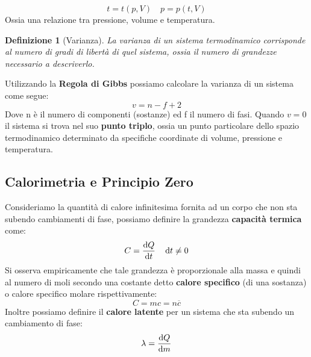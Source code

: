 \documentclass{article}
\newtheorem{defn}{Definizione}[section]
\begin{document}
\[t=t(p,V)\quad p=p(t,V)\]
Ossia una relazione tra pressione, volume e temperatura.
\begin{defn}[Varianza]
La varianza di un sistema termodinamico corrisponde al numero di gradi di libertà di quel sistema, ossia il numero di grandezze necessario a descriverlo. 
\end{defn}
Utilizzando la \textbf{Regola di Gibbs} possiamo calcolare la varianza di un sistema come segue:
\begin{equation}
    \boxed{v=n-f+2}
\end{equation}
Dove n è il numero di componenti (sostanze) ed f il numero di fasi. Quando $v=0$ il sistema si trova nel suo \textbf{punto triplo}, ossia un punto particolare dello spazio termodinamico determinato da specifiche coordinate di volume, pressione e temperatura. 

\subsection{Calorimetria e Principio Zero}

Consideriamo la quantità di calore infinitesima fornita ad un corpo che non sta subendo cambiamenti di fase, possiamo definire la grandezza \textbf{capacità termica} come:
\[C=\dv{Q}{t}\quad\dif t\neq 0\]
Si osserva empiricamente che tale grandezza è proporzionale alla massa e quindi al numero di moli secondo una costante detto \textbf{calore specifico} (di una sostanza) o calore specifico molare rispettivamente:
\[C=mc=n\overline{c}\]
Inoltre possiamo definire il \textbf{calore latente} per un sistema che sta subendo un cambiamento di fase:
\[\lambda=\dv{Q}{m}\]\\
\end{document}
